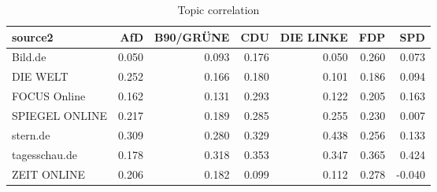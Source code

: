\begin{table}[ht]
\centering
\begin{tabular}{lrrrrrr}
  \hline
source2 & AfD & B90/GRÜNE & CDU & DIE LINKE & FDP & SPD \\ 
  \hline
Bild.de & 0.050 & 0.093 & 0.176 & 0.050 & 0.260 & 0.073 \\ 
  DIE WELT & 0.252 & 0.166 & 0.180 & 0.101 & 0.186 & 0.094 \\ 
  FOCUS Online & 0.162 & 0.131 & 0.293 & 0.122 & 0.205 & 0.163 \\ 
  SPIEGEL ONLINE & 0.217 & 0.189 & 0.285 & 0.255 & 0.230 & 0.007 \\ 
  stern.de & 0.309 & 0.280 & 0.329 & 0.438 & 0.256 & 0.133 \\ 
  tagesschau.de & 0.178 & 0.318 & 0.353 & 0.347 & 0.365 & 0.424 \\ 
  ZEIT ONLINE & 0.206 & 0.182 & 0.099 & 0.112 & 0.278 & -0.040 \\ 
   \hline
\end{tabular}
\caption{Topic correlation} 
\end{table}

